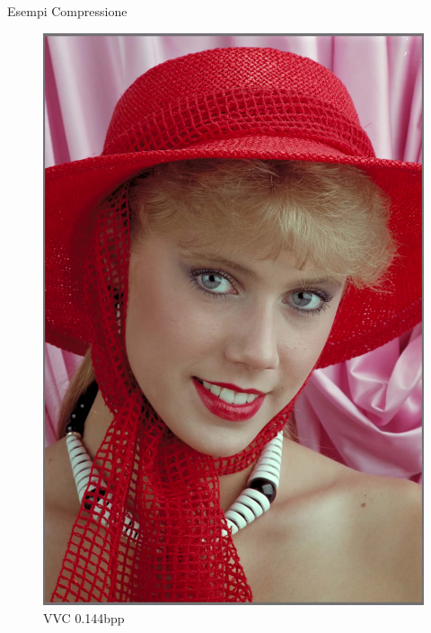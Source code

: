 \begin{frame}{Esempi Compressione}
\begin{figure}[!ht]
\begin{minipage}[]{0.13\linewidth}
                \includegraphics[width=\textwidth]{Immagini/IMAGES/VVC_2_IMG0004.pdf}
                \caption{VVC 0.144bpp}
                \label{fig:ExampleVVC}
            \end{minipage}
            \begin{minipage}[]{0.13\linewidth}
                \centering

\end{minipage}
\end{figure}
\end{frame}
